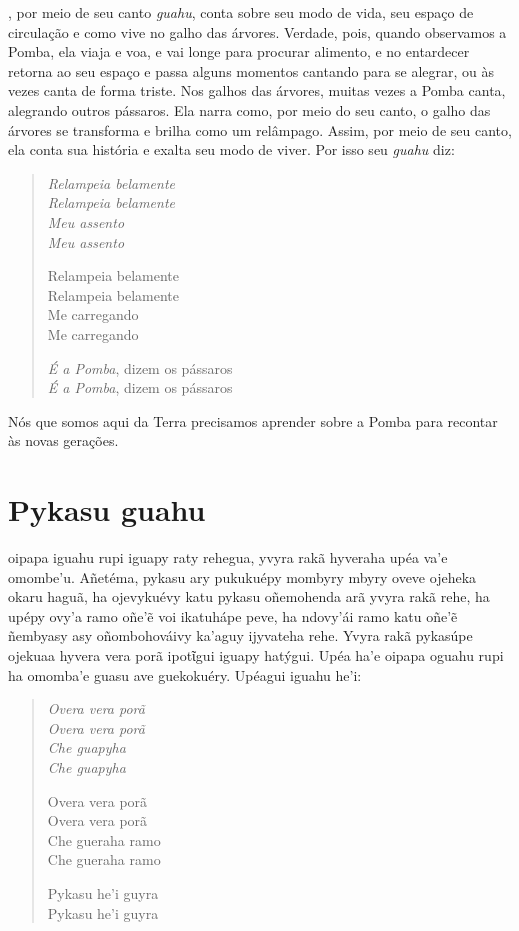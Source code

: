 , por meio de seu canto \emph{guahu}, conta sobre seu modo de vida,
seu espaço de circulação e como vive no galho das árvores. Verdade,
pois, quando observamos a Pomba, ela viaja e voa, e vai longe para
procurar alimento, e no entardecer retorna ao seu espaço e passa alguns
momentos cantando para se alegrar, ou às vezes canta de forma triste.
Nos galhos das árvores, muitas vezes a Pomba canta, alegrando outros
pássaros. Ela narra como, por meio do seu canto, o galho das árvores se
transforma e brilha como um relâmpago. Assim, por meio de seu canto, ela
conta sua história e exalta seu modo de viver. Por isso seu \emph{guahu}
diz:

\begin{verse}
\itshape
Relampeia belamente\\
Relampeia belamente\\
Meu assento\\
Meu assento

Relampeia belamente\\
Relampeia belamente\\
Me carregando\\
Me carregando

\emph{É a Pomba}, dizem os pássaros\\
\emph{É a Pomba}, dizem os pássaros
\end{verse}

Nós que somos aqui da Terra precisamos aprender sobre a Pomba para
recontar às novas gerações.

\chapter{Pykasu guahu}

 oipapa iguahu rupi iguapy raty rehegua, yvyra rakã hyveraha upéa
va'e omombe'u. Añetéma, pykasu ary pukukuépy mombyry mbyry oveve ojeheka
okaru haguã, ha ojevykuévy katu pykasu oñemohenda arã yvyra rakã rehe,
ha upépy ovy'a ramo oñe'ẽ voi ikatuhápe peve, ha ndovy'ái ramo katu
oñe'ẽ ñembyasy asy oñombohováivy ka'aguy ijyvateha rehe. Yvyra rakã
pykasúpe ojekuaa hyvera vera porã ipotῖgui iguapy hatýgui. Upéa ha'e
oipapa oguahu rupi ha omomba'e guasu ave guekokuéry. Upéagui iguahu
he'i:

\begin{verse}
\itshape
Overa vera porã\\
Overa vera porã\\
Che guapyha\\
Che guapyha

Overa vera porã\\
Overa vera porã\\
Che gueraha ramo\\
Che gueraha ramo

Pykasu he'i guyra\\
Pykasu he'i guyra
\end{verse}

